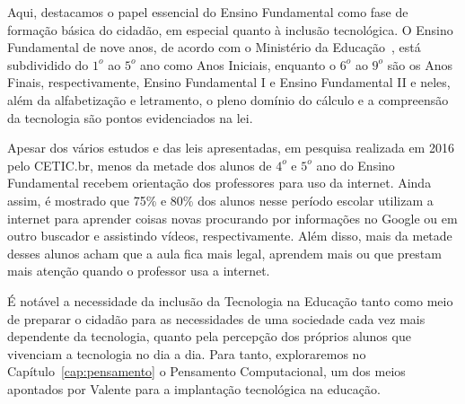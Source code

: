 Aqui, destacamos o papel essencial do Ensino Fundamental como fase de formação básica do cidadão, em especial quanto à inclusão tecnológica. O Ensino Fundamental de nove anos, de acordo com o Ministério da Educação~\cite{ministerio_da_educacao_ensino_2009}, está subdividido do $1^o$ ao $5^o$ ano como Anos Iniciais, enquanto o $6^o$ ao $9^o$ são os Anos Finais, respectivamente, Ensino Fundamental I e Ensino Fundamental II e neles, além da alfabetização e letramento, o pleno domínio do cálculo e a compreensão da tecnologia são pontos evidenciados na lei.

Apesar dos vários estudos e das leis apresentadas, em pesquisa realizada em 2016 pelo \acrfull{CETIC.br}, menos da metade dos alunos de $4^o$ e $5^o$ ano do Ensino Fundamental recebem orientação dos professores para uso da internet. Ainda assim, é mostrado que 75\% e 80\% dos alunos nesse período escolar utilizam a internet para aprender coisas novas procurando por informações no Google ou em outro buscador e assistindo vídeos, respectivamente. Além disso, mais da metade desses alunos acham que a aula fica mais legal, aprendem mais ou que prestam mais atenção quando o professor usa a internet.

É notável a necessidade da inclusão da Tecnologia na Educação tanto como meio de preparar o cidadão para as necessidades de uma sociedade cada vez mais dependente da tecnologia, quanto pela percepção dos próprios alunos que vivenciam a tecnologia no dia a dia. Para tanto, exploraremos no Capítulo~\ref{cap:pensamento} o Pensamento Computacional, um dos meios apontados por Valente para a implantação tecnológica na educação.